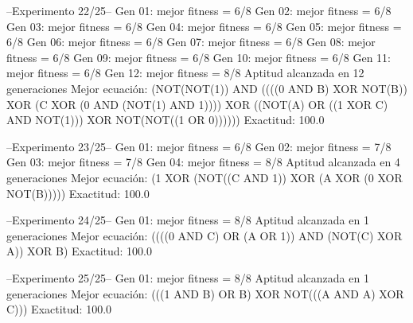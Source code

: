 --Experimento 
 22/25--
Gen 01: mejor fitness = 6/8
Gen 02: mejor fitness = 6/8
Gen 03: mejor fitness = 6/8
Gen 04: mejor fitness = 6/8
Gen 05: mejor fitness = 6/8
Gen 06: mejor fitness = 6/8
Gen 07: mejor fitness = 6/8
Gen 08: mejor fitness = 6/8
Gen 09: mejor fitness = 6/8
Gen 10: mejor fitness = 6/8
Gen 11: mejor fitness = 6/8
Gen 12: mejor fitness = 8/8
Aptitud alcanzada en 12 generaciones
Mejor ecuación: (NOT(NOT(1)) AND ((((0 AND B) XOR NOT(B)) XOR (C XOR (0 AND (NOT(1) AND 1)))) XOR ((NOT(A) OR ((1 XOR C) AND NOT(1))) XOR NOT(NOT((1 OR 0))))))
 Exactitud: 100.0%

--Experimento 
 23/25--
Gen 01: mejor fitness = 6/8
Gen 02: mejor fitness = 7/8
Gen 03: mejor fitness = 7/8
Gen 04: mejor fitness = 8/8
Aptitud alcanzada en 4 generaciones
Mejor ecuación: (1 XOR (NOT((C AND 1)) XOR (A XOR (0 XOR NOT(B)))))
 Exactitud: 100.0%

--Experimento 
 24/25--
Gen 01: mejor fitness = 8/8
Aptitud alcanzada en 1 generaciones
Mejor ecuación: ((((0 AND C) OR (A OR 1)) AND (NOT(C) XOR A)) XOR B)
 Exactitud: 100.0%

--Experimento 
 25/25--
Gen 01: mejor fitness = 8/8
Aptitud alcanzada en 1 generaciones
Mejor ecuación: (((1 AND B) OR B) XOR NOT(((A AND A) XOR C)))
 Exactitud: 100.0%



